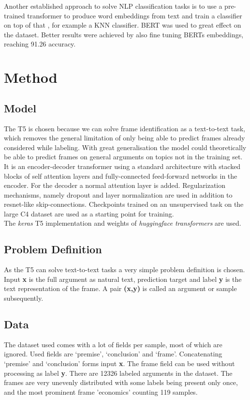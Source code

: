 \documentclass[11pt,a4paper,onecolumn,oneside,notitlepage]{article}
\begin{document}
Another established approach to solve  NLP classification tasks is to use a pre-trained transformer to produce word embeddings from text and train a classifier on top of that , for example a KNN classifier. BERT was used\citep{bert_frame_ident} to great effect on the \citep{bert_dataset} dataset. Better results were achieved by also fine tuning BERTs embeddings, reaching \num{91.26} accuracy.  


\section{Method}
\label{method}

\subsection{Model}
The T5 is chosen because we can solve frame identification as a text-to-text task, which removes the general limitation of only being able to predict frames already considered while labeling. With great generalisation the model could theoretically be able to predict frames on general arguments on topics not in the training set. It is an encoder-decoder transformer using a standard architecture with stacked blocks of  self attention layers and fully-connected feed-forward networks in the encoder. For the decoder a normal attention layer is added. Regularization mechanisms, namely dropout and layer normalization are used in addition to resnet-like skip-connections.\citep{T5} Checkpoints trained on an unsupervised task on the large C4 \citep{2019t5} dataset are used as a starting point for training.\\

The \textit{keras} \citep{keras} T5 implementation and weights of \textit{huggingface transformers} \citep{wolf-etal-2020-transformers} are used.


\subsection{Problem Definition}

As the T5 can solve text-to-text tasks a very simple problem definition is chosen. Input \textbf{x} is the full argument as natural text, prediction target and label \textbf{y} is the text representation of the frame. A pair \textbf{(x,y)} is called an argument or sample subsequently. 
\subsection{Data}
\label{subsec:data}
The dataset used \citep{webis_task_paper}  comes with a lot of fields per sample, most of which are ignored. Used fields are ‘premise’, ‘conclusion’ and ‘frame’. Concatenating ‘premise’ and ‘conclusion’ forms input \textbf{x}. The frame field can be used without processing as label \textbf{y}. There are \num{12326} labeled arguments in the dataset. The frames are very unevenly distributed with some labels being present only once, and the most prominent frame 'economics' counting 119 samples.
\end{document}
